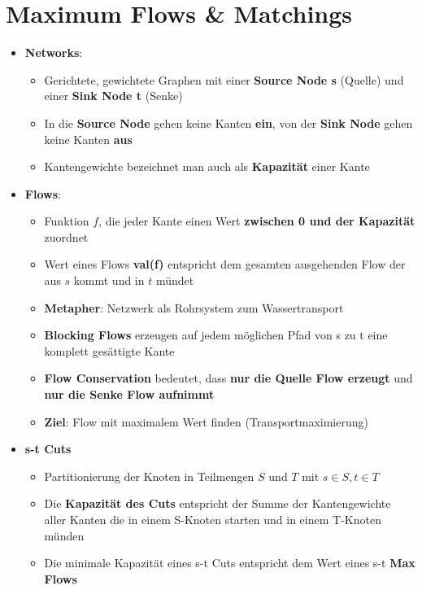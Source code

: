 \section{Maximum Flows \& Matchings}%
\label{mfm:sec:maximum_flows_matchings}

\begin{itemize}
	\item \textbf{Networks}:
	\begin{itemize}
		\item Gerichtete, gewichtete Graphen mit einer \textbf{Source Node s} (Quelle) und einer \textbf{Sink Node t} (Senke)
		\item In die \textbf{Source Node} gehen keine Kanten \textbf{ein}, von der \textbf{Sink Node} gehen keine Kanten \textbf{aus}
		\item Kantengewichte bezeichnet man auch als \textbf{Kapazität} einer Kante
	\end{itemize}
	\item \textbf{Flows}:
	\begin{itemize}
		\item Funktion $f$, die jeder Kante einen Wert \textbf{zwischen 0 und der Kapazität} zuordnet
		\item Wert eines Flows \textbf{val(f)} entspricht dem gesamten ausgehenden Flow der aus $s$ kommt und in $t$ mündet
		\item \textbf{Metapher}: Netzwerk als Rohrsystem zum Wassertransport
		\item \textbf{Blocking Flows} erzeugen auf jedem möglichen Pfad von s zu t eine komplett gesättigte Kante
		\item \textbf{Flow Conservation} bedeutet, dass \textbf{nur die Quelle Flow erzeugt} und \textbf{nur die Senke Flow aufnimmt}
		\item \textbf{Ziel}: Flow mit maximalem Wert finden (Transportmaximierung)
	\end{itemize}
	\item \textbf{s-t Cuts}
	\begin{itemize}
		\item Partitionierung der Knoten in Teilmengen $S$ und $T$ mit $s \in S, t \in T$
		\item Die \textbf{Kapazität des Cuts} entspricht der Summe der Kantengewichte aller Kanten die in einem S-Knoten starten und in einem T-Knoten münden
		\item Die minimale Kapazität eines s-t Cuts entspricht dem Wert eines s-t \textbf{Max Flows}
	\end{itemize}
\end{itemize}

